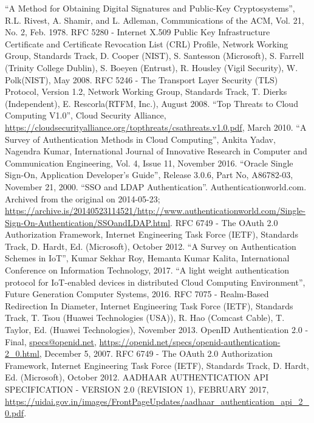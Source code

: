 \begin{multicols}{2}
\begin{thebibliography}{99}
 ``A Method for Obtaining Digital Signatures and Public-Key Cryptosystems'', R.L. Rivest, A. Shamir, and L. Adleman, Communications of the ACM, Vol. 21, No. 2, Feb. 1978.
 RFC 5280 - Internet X.509 Public Key Infrastructure Certificate and Certificate Revocation List (CRL) Profile, Network Working Group, Standards Track, D. Cooper (NIST), S. Santesson (Microsoft), S. Farrell (Trinity College Dublin), S. Boeyen (Entrust), R. Housley (Vigil Security), W. Polk(NIST), May 2008.
 RFC 5246 - The Transport Layer Security (TLS) Protocol, Version 1.2, Network Working Group, Standards Track, T. Dierks (Independent), E. Rescorla(RTFM, Inc.), August 2008.
 ``Top Threats to Cloud Computing V1.0'', Cloud Security Alliance, \url{https://cloudsecurityalliance.org/topthreats/csathreats.v1.0.pdf}, March 2010.
 ``A Survey of Authentication Methods in Cloud Computing'', Ankita Yadav, Nagendra Kumar, International Journal of Innovative Research in Computer and Communication Engineering, Vol. 4, Issue 11, November 2016.
 ``Oracle Single Sign-On, Application Developer's Guide'', Release 3.0.6, Part No, A86782-03, November 21, 2000.
 ``SSO and LDAP Authentication''. Authenticationworld.com. Archived from the original on 2014-05-23; \url{https://archive.is/20140523114521/http://www.authenticationworld.com/Single-Sign-On-Authentication/SSOandLDAP.html}.
 RFC 6749 - The OAuth 2.0 Authorization Framework, Internet Engineering Task Force (IETF), Standards Track, D. Hardt, Ed. (Microsoft), October 2012.
 ``A Survey on Authentication Schemes in IoT'', Kumar Sekhar Roy, Hemanta Kumar Kalita, International Conference on Information Technology, 2017.
 ``A light weight authentication protocol for IoT-enabled devices in distributed Cloud Computing Environment'', Future Generation Computer Systems, 2016.
 RFC 7075 - Realm-Based Redirection In Diameter, Internet Engineering Task Force (IETF), Standards Track, T. Tsou (Huawei Technologies (USA)), R. Hao (Comcast Cable), T. Taylor, Ed. (Huawei Technologies), November 2013.
 OpenID Authentication 2.0 - Final, \url{specs@openid.net}, \url{https://openid.net/specs/openid-authentication-2_0.html}, December 5, 2007.
 RFC 6749 - The OAuth 2.0 Authorization Framework, Internet Engineering Task Force (IETF), Standards Track, D. Hardt, Ed. (Microsoft), October 2012.
 AADHAAR AUTHENTICATION API SPECIFICATION - VERSION 2.0 (REVISION 1), FEBRUARY 2017, \url{https://uidai.gov.in/images/FrontPageUpdates/aadhaar_authentication_api_2_0.pdf}.
\end{thebibliography}
\end{multicols}




